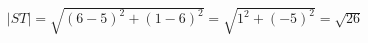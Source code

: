 \documentclass[preview]{standalone}
\begin{document}
\begin{align*}
|ST| = \sqrt{(6-5)^2 + (1-6)^2} = \sqrt{1^2 + (-5)^2} = \sqrt{26}
\end{align*}
\end{document}
